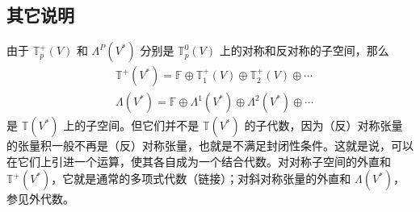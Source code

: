 \subsection{其它说明}
由于 $\mathbb T_p^+(V)$ 和 $\Lambda^P(V^*)$ 分别是 $\mathbb T_p^0(V)$ 上的对称和反对称的子空间，那么
\begin{equation}
\begin{aligned}
&\mathbb T^+(V^*)=\mathbb F\oplus\mathbb T_1^+(V)\oplus\mathbb T_2^+(V)\oplus\cdots\\
&\Lambda(V^*)=\mathbb F\oplus \Lambda^1(V^*)\oplus\Lambda^2(V^*)\oplus\cdots
\end{aligned}
\end{equation}
是 $\mathbb T(V^*)$ 上的子空间。但它们并不是 $\mathbb T(V^*)$ 的子代数，因为（反）对称张量的张量积一般不再是（反）对称张量，也就是不满足封闭性条件。这就是说，可以在它们上引进一个运算，使其各自成为一个结合代数。对对称子空间的外直和 $\mathbb T^+(V^*)$，它就是通常的多项式代数（链接）；对斜对称张量的外直和 $\Lambda(V^*)$，参见外代数。